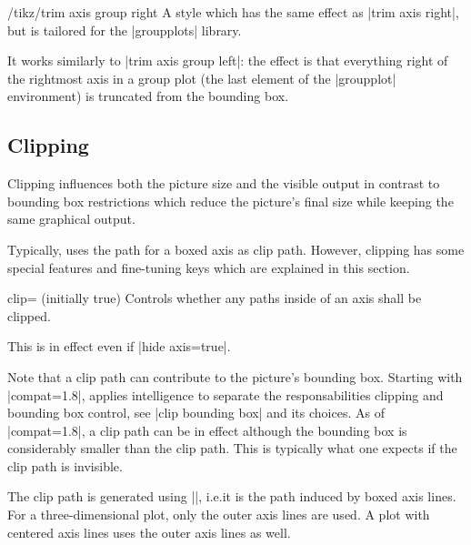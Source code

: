 \begin{stylekey}{/tikz/trim axis group right}
    A style which has the same effect as |trim axis right|, but is tailored for
    the |groupplots| library.

    It works similarly to |trim axis group left|: the effect is that everything
    right of the rightmost axis in a group plot (the last element of the
    |groupplot| environment) is truncated from the bounding box.
\end{stylekey}


\subsection{Clipping}
\label{sec:clipping}

Clipping influences both the picture size and the visible output in contrast to
bounding box restrictions which reduce the picture's final size while keeping
the same graphical output.

Typically, \PGFPlots{} uses the path for a boxed axis as clip path. However,
clipping has some special features and fine-tuning keys which are explained in
this section.

\begin{pgfplotskey}{clip= (initially true)}
    Controls whether any paths inside of an axis shall be clipped.

    This is in effect even if |hide axis=true|.

    Note that a clip path can contribute to the picture's bounding box.
    Starting with |compat=1.8|, \PGFPlots{} applies intelligence to separate
    the responsabilities clipping and bounding box control, see
    |clip bounding box| and its choices. As of |compat=1.8|, a clip path can be
    in effect although the bounding box is considerably smaller than the clip
    path. This is typically what one expects if the clip path is invisible.

    The clip path is generated using |\pgfplotspathaxisoutline|, i.e.\@ it is
    the path induced by boxed axis lines. For a three-dimensional plot, only
    the outer axis lines are used. A plot with centered axis lines uses the
    outer axis lines as well.
\end{pgfplotskey}

